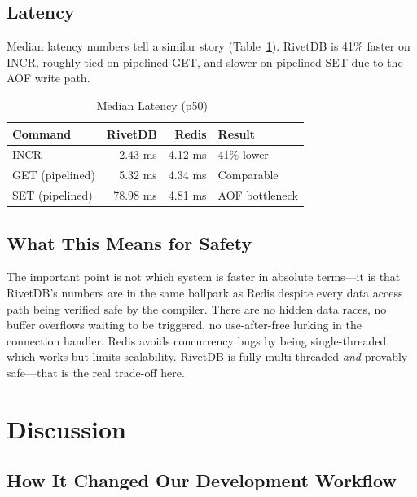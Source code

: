 \documentclass[conference,a4paper]{IEEEtran}
\begin{document}
\subsection{Latency}

Median latency numbers tell a similar story (Table~\ref{tab:perf_latency}). RivetDB is 41\% faster on INCR, roughly tied on pipelined GET, and slower on pipelined SET due to the AOF write path.

\begin{table}[htbp]
\caption{Median Latency (p50)~\cite{shimpi2026rivetdb}}
\label{tab:perf_latency}
\centering
\begin{tabular}{@{}lrrl@{}}
\toprule
\textbf{Command} & \textbf{RivetDB} & \textbf{Redis} & \textbf{Result} \\
\midrule
INCR & 2.43 ms & 4.12 ms & 41\% lower \\
GET (pipelined) & 5.32 ms & 4.34 ms & Comparable \\
SET (pipelined) & 78.98 ms & 4.81 ms & AOF bottleneck \\
\bottomrule
\end{tabular}
\end{table}

\subsection{What This Means for Safety}

The important point is not which system is faster in absolute terms---it is that RivetDB's numbers are in the same ballpark as Redis despite every data access path being verified safe by the compiler. There are no hidden data races, no buffer overflows waiting to be triggered, no use-after-free lurking in the connection handler. Redis avoids concurrency bugs by being single-threaded, which works but limits scalability. RivetDB is fully multi-threaded \emph{and} provably safe---that is the real trade-off here.

\section{Discussion}

\subsection{How It Changed Our Development Workflow}
\end{document}
